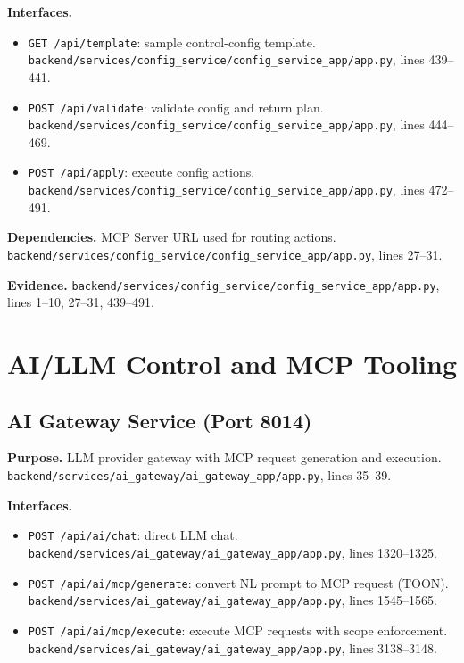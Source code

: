 \documentclass[10pt,a4paper]{article}
\begin{document}
\textbf{Interfaces.}
\begin{itemize}[leftmargin=*]
\item \texttt{GET /api/template}: sample control-config template. \texttt{backend/services/config\_service/config\_service\_app/app.py}, lines 439--441.
\item \texttt{POST /api/validate}: validate config and return plan. \texttt{backend/services/config\_service/config\_service\_app/app.py}, lines 444--469.
\item \texttt{POST /api/apply}: execute config actions. \texttt{backend/services/config\_service/config\_service\_app/app.py}, lines 472--491.
\end{itemize}

\textbf{Dependencies.} MCP Server URL used for routing actions. \texttt{backend/services/config\_service/config\_service\_app/app.py}, lines 27--31.

\textbf{Evidence.} \texttt{backend/services/config\_service/config\_service\_app/app.py}, lines 1--10, 27--31, 439--491.

\section{AI/LLM Control and MCP Tooling}

\subsection{AI Gateway Service (Port 8014)}

\textbf{Purpose.} LLM provider gateway with MCP request generation and execution. \texttt{backend/services/ai\_gateway/ai\_gateway\_app/app.py}, lines 35--39.

\textbf{Interfaces.}
\begin{itemize}[leftmargin=*]
\item \texttt{POST /api/ai/chat}: direct LLM chat. \texttt{backend/services/ai\_gateway/ai\_gateway\_app/app.py}, lines 1320--1325.
\item \texttt{POST /api/ai/mcp/generate}: convert NL prompt to MCP request (TOON). \texttt{backend/services/ai\_gateway/ai\_gateway\_app/app.py}, lines 1545--1565.
\item \texttt{POST /api/ai/mcp/execute}: execute MCP requests with scope enforcement. \texttt{backend/services/ai\_gateway/ai\_gateway\_app/app.py}, lines 3138--3148.
\end{itemize}
\end{document}
